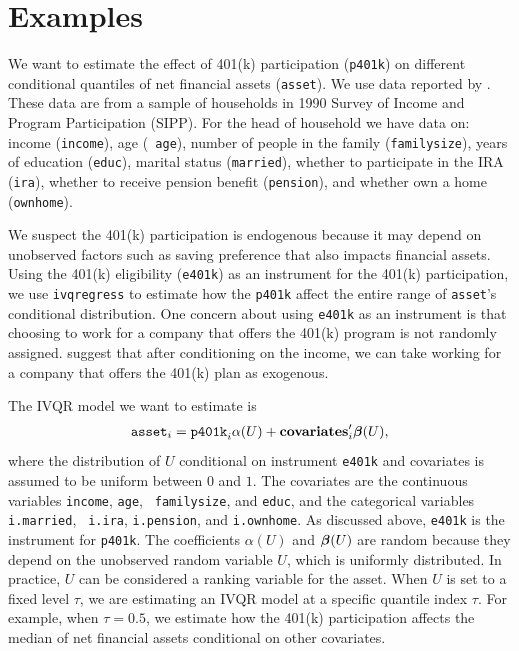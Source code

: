 \section{Examples} \label{sec:example}
We want to estimate the effect of 401(k) participation ({\tt p401k}) on
different conditional quantiles of net financial assets ({\tt asset}).  We
use data reported by \cite{Chernozhukov2004}.  These data are from a sample of
households in 1990 Survey of Income and Program Participation (SIPP). 
For the head of household we have data on: income ({\tt income}), age ({\tt
age}), number of people in the family ({\tt familysize}), years of education
({\tt educ}), marital status ({\tt married}), whether to participate in the IRA
({\tt ira}), whether to receive pension benefit ({\tt pension}), and whether own
a home ({\tt ownhome}).

We suspect the 401(k) participation is endogenous because it may depend on
unobserved factors such as saving preference that also impacts financial assets.
Using the 401(k) eligibility ({\tt e401k}) as an instrument for the 401(k)
participation, we use {\tt ivqregress} to estimate how the {\tt p401k} affect
the entire range of {\tt asset}'s conditional distribution. One concern about
using {\tt e401k} as an instrument is that choosing to work for a company that
offers the 401(k) program is not randomly assigned. \cite{Poterba1995} suggest
that after conditioning on the income, we can take working for a company that
offers the 401(k) plan as exogenous.

The IVQR model we want to estimate is
\begin{align}
{\tt asset}_i = {\tt p401k}_i\alpha(U) +  {\bf covariates}_i'\boldsymbol{\beta}(U),  
\label{eq:asset}
\end{align}
where the distribution of $U$ conditional on instrument {\tt e401k} and
covariates is assumed to be uniform between $0$ and $1$.
The covariates are the continuous variables {\tt income}, {\tt age}, {\tt
familysize}, and {\tt educ}, and the categorical variables {\tt i.married}, {\tt
i.ira}, {\tt i.pension}, and {\tt i.ownhome}. As discussed above, {\tt e401k} is
the instrument for {\tt p401k}. The coefficients $\alpha(U)$ and $\boldsymbol{\beta}(U)$ are
random because they depend on the unobserved random variable $U$, which is
uniformly distributed. In practice, $U$ can be considered a ranking variable for
the asset. When $U$ is set to a fixed level $\tau$, we are estimating an IVQR
model at a specific quantile index $\tau$. For example, when $\tau = 0.5$, we
estimate how the 401(k) participation affects the median of net financial assets
conditional on other covariates.

